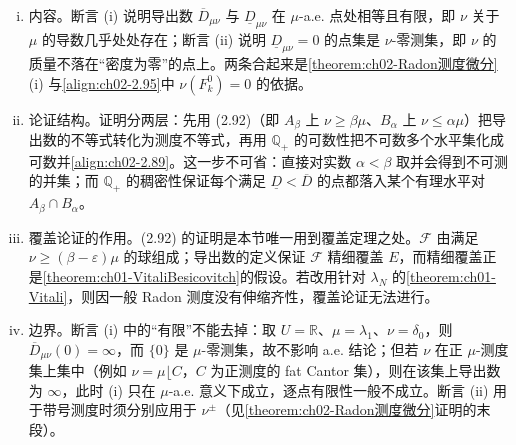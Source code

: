 \documentclass[../../main.tex]{subfiles}%
\begin{document}
\begin{remark}\label{remark:ch02-微分零测}
\begin{enumerate}[(i)]
\item 内容。断言 (i) 说明导出数 $\overline{D}_{\mu\nu}$ 与 $\underline{D}_{\mu\nu}$ 在 $\mu$-a.e. 点处相等且有限，即 $\nu$ 关于 $\mu$ 的导数几乎处处存在；断言 (ii) 说明 $\underline{D}_{\mu\nu}=0$ 的点集是 $\nu$-零测集，即 $\nu$ 的质量不落在“密度为零”的点上。两条合起来是\cref{theorem:ch02-Radon测度微分}(i) 与\eqref{align:ch02-2.95}中 $\nu(F_k^0)=0$ 的依据。
\item 论证结构。证明分两层：先用 (2.92)（即 $A_\beta$ 上 $\nu\geqslant\beta\mu$、$B_\alpha$ 上 $\nu\leqslant\alpha\mu$）把导出数的不等式转化为测度不等式，再用 $\mathbb{Q}_+$ 的可数性把不可数多个水平集化成可数并\eqref{align:ch02-2.89}。这一步不可省：直接对实数 $\alpha<\beta$ 取并会得到不可测的并集；而 $\mathbb{Q}_+$ 的稠密性保证每个满足 $\underline{D}<\overline{D}$ 的点都落入某个有理水平对 $A_\beta\cap B_\alpha$。
\item 覆盖论证的作用。(2.92) 的证明是本节唯一用到覆盖定理之处。$\mathscr{F}$ 由满足 $\nu\geqslant(\beta-\varepsilon)\mu$ 的球组成；导出数的定义保证 $\mathscr{F}$ 精细覆盖 $E$，而精细覆盖正是\cref{theorem:ch01-VitaliBesicovitch}的假设。若改用针对 $\lambda_N$ 的\cref{theorem:ch01-Vitali}，则因一般 Radon 测度没有伸缩齐性，覆盖论证无法进行。
\item 边界。断言 (i) 中的“有限”不能去掉：取 $U=\mathbb{R}$、$\mu=\lambda_1$、$\nu=\delta_0$，则 $\overline{D}_{\mu\nu}(0)=\infty$，而 $\{0\}$ 是 $\mu$-零测集，故不影响 a.e. 结论；但若 $\nu$ 在正 $\mu$-测度集上集中（例如 $\nu=\mu\lfloor C$，$C$ 为正测度的 fat Cantor 集），则在该集上导出数为 $\infty$，此时 (i) 只在 $\mu$-a.e. 意义下成立，逐点有限性一般不成立。断言 (ii) 用于带号测度时须分别应用于 $\nu^\pm$（见\cref{theorem:ch02-Radon测度微分}证明的末段）。
\end{enumerate}
\end{remark}
\end{document}
